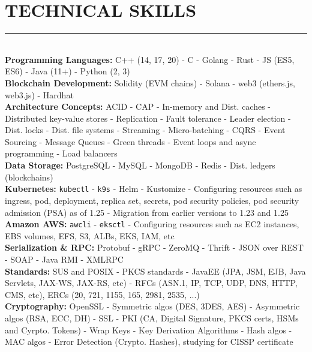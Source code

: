 \documentclass[10pt,a4paper]{article}
\begin{document}
\section{TECHNICAL SKILLS}
\noindent \rule {18.0cm}{0.2pt} \\
\noindent
\textbullet \hspace{0.1cm}\textbf{Programming Languages:} C++ (14, 17, 20) - C - Golang - Rust - JS (ES5, ES6) - Java (11+) - Python (2, 3) \\
\textbullet \hspace{0.1cm}\textbf{Blockchain Development:} Solidity (EVM chains) - Solana - web3 (ethers.js, web3.js) - Hardhat \\
\textbullet \hspace{0.1cm}\textbf{Architecture Concepts:} ACID - CAP - In-memory and Dist. caches - Distributed key-value stores - Replication - Fault tolerance - Leader election - Dist. locks - Dist. file systems - Streaming - Micro-batching - CQRS - Event Sourcing - Message Queues - Green threads - Event loops and async programming - Load balancers \\
\textbullet \hspace{0.1cm}\textbf{Data Storage:} PostgreSQL - MySQL - MongoDB - Redis - Dist. ledgers (blockchains) \\
\textbullet \hspace{0.1cm}\textbf{Kubernetes:} \texttt{kubectl} - \texttt{k9s} - Helm - Kustomize - Configuring resources such as ingress, pod, deployment, replica set, secrets, pod security policies, pod security admission (PSA) as of 1.25 - Migration from earlier versions to 1.23 and 1.25  \\
\textbullet \hspace{0.1cm}\textbf{Amazon AWS:} \texttt{awcli} - \texttt{eksctl} - Configuring resources such as EC2 instances, EBS volumes, EFS, S3, ALBs, EKS, IAM, etc \\
\textbullet \hspace{0.1cm}\textbf{Serialization \& RPC:} Protobuf - gRPC - ZeroMQ - Thrift - JSON over REST - SOAP - Java RMI - XMLRPC \\
\textbullet \hspace{0.1cm}\textbf{Standards:} SUS and POSIX - PKCS standards - JavaEE (JPA, JSM, EJB, Java Servlets, JAX-WS, JAX-RS, etc) - RFCs (ASN.1, IP, TCP, UDP, DNS, HTTP, CMS, etc), ERCs (20, 721, 1155, 165, 2981, 2535, ...) \\
\textbullet \hspace{0.1cm}\textbf{Cryptography:} OpenSSL - Symmetric algos (DES, 3DES, AES) - Asymmetric algos (RSA, ECC, DH) - SSL - PKI (CA, Digital Signature, PKCS certs, HSMs and Cyrpto. Tokens) - Wrap Keys - Key Derivation Algorithms - Hash algos - MAC algos - Error Detection (Crypto. Hashes), studying for CISSP certificate  \\ 
\end{document}
